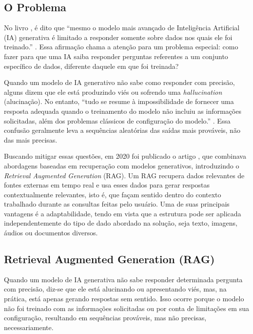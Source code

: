 \documentclass[a4paper, 12pt]{article}
\newcommand{\citeb}[1]{\bibleftbracket\cite{#1}\bibrightbracket}
\begin{document}
    
    \subsection{O Problema} \label{sec:problem}

    No livro , é dito que ``mesmo o modelo mais avançado de Inteligência Artificial (IA) generativa é limitado a responder somente sobre dados nos quais ele foi treinado.'' \citeb{rothman}. Essa afirmação chama a atenção para um problema especial: como fazer para que uma IA saiba responder perguntas referentes a um conjunto específico de dados, diferente daquele em que foi treinada?

    Quando um modelo de IA generativo não sabe como responder com precisão, alguns dizem que ele está produzindo viés ou sofrendo uma \textit{hallucination} (alucinação). No entanto, ``tudo se resume à impossibilidade de fornecer uma resposta adequada quando o treinamento do modelo não incluiu as informações solicitadas, além dos problemas clássicos de configuração do modelo.'' \citeb{rothman}. Essa confusão geralmente leva a sequências aleatórias das saídas mais prováveis, não das mais precisas.

    Buscando mitigar essas questões, em 2020 foi publicado o artigo  \citeb{RAG}, que combinava abordagens baseadas em recuperação com modelos generativos, introduzindo o \textit{Retrieval Augmented Generation} (RAG). Um RAG recupera dados relevantes de fontes externas em tempo real e usa esses dados para gerar respostas contextualmente relevantes, isto é, que façam sentido dentro do contexto trabalhado durante as consultas feitas pelo usuário. Uma de suas principais vantagens é a adaptabilidade, tendo em vista que a estrutura pode ser aplicada independentemente do tipo de dado abordado na solução, seja texto, imagens, áudios ou documentos diversos.


    \subsection{Retrieval Augmented Generation (RAG)}
    
    Quando um modelo de IA generativa não sabe responder determinada pergunta com precisão, diz-se que ele está alucinando ou apresentando viés, mas, na prática, está apenas gerando respostas sem sentido. Isso ocorre porque o modelo não foi treinado com as informações solicitadas ou por conta de limitações em sua configuração, resultando em sequências prováveis, mas não precisas, necessariamente.
\end{document}
